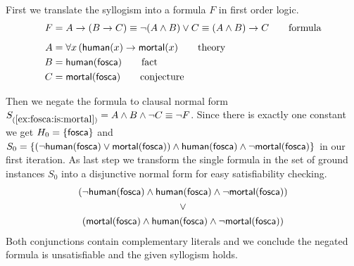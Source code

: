 \begin{example}\label{ex:fosca:is:mortal}
	First we translate the syllogism into a formula $F$ in first order logic.
	\begin{align*}
		F &= A \rightarrow (B \rightarrow C) \equiv \lnot(A\land B) \lor C \equiv (A\land B)\rightarrow C  
		\tag*{formula}
		\\[0.5em]
		A &= \forall x\, ( \mathsf{human}(x) \rightarrow \mathsf{mortal}(x) 
		\tag*{theory}
		\\
		B &= \mathsf{human}(\mathsf{fosca}) 
		\tag*{fact}
		\\
		C &= \mathsf{mortal}(\mathsf{fosca})
		\tag*{conjecture}
	\end{align*}
 


	Then we negate the formula to clausal normal form $S_{(\ref{ex:fosca:is:mortal})} = A\land B \land\lnot C \equiv \lnot F$.
	Since there is exactly one constant we get
	$H_0 = \{ \mathsf{fosca} \}$ and 
	$S_0 = 
	\{
	(\lnot\mathsf{human}(\mathsf{fosca})\lor\mathsf{mortal}(\mathsf{fosca}))\land\mathsf{human}(\mathsf{fosca})\land\lnot\mathsf{mortal}(\mathsf{fosca})
	\}$ in our first iteration. 
	As last step we transform the single formula in 
	the set of ground instances $S_0$ into a disjunctive normal form 
	for easy satisfiability checking.
%
\begin{gather*}
(\lnot\mathsf{human}(\mathsf{fosca})\land\mathsf{human}(\mathsf{fosca})\land\lnot\mathsf{mortal}(\mathsf{fosca}))
\\ 
\lor
\\ 
(\mathsf{mortal}(\mathsf{fosca})\land\mathsf{human}(\mathsf{fosca})\land\lnot\mathsf{mortal}(\mathsf{fosca}))
\end{gather*}
Both conjunctions contain complementary literals and we conclude the negated formula is unsatisfiable
 and the given syllogism holds.
 
\end{example}

